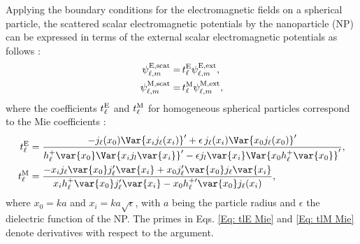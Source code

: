 Applying the boundary conditions for the electromagnetic fields on a spherical particle, the scattered scalar electromagnetic potentials by the nanoparticle (NP) can be expressed in terms of the external scalar electromagnetic potentials as follows \cite{de1999relativistic}:
\begin{align}
\psi_{\ell, m}^{\rm E, scat} =& \,t_{\ell}^{\rm E} \psi_{\ell, m}^{\rm E, \text{ext}}, \label{Eq: psilm E scat}\\
\psi_{\ell, m}^{\rm M, scat} =& \,t_{\ell}^{\rm M} \psi_{\ell, m}^{\rm M, \text{ext}}, \label{Eq: psilm M scat}
\end{align} 
where the coefficients $t_{\ell}^{\rm E}$ and $t_{\ell}^{\rm M}$ for homogeneous spherical particles correspond to the Mie coefficients \cite{Bohren}:
\begin{align}
t_{\ell}^{\rm E} &=\frac{-j_{\ell}(x_0)\Var{x_i j_{\ell}(x_i)}^{\prime}+\epsilon\,j_{\ell}(x_i)\Var{x_0j_{\ell}(x_0)}^{\prime}}{h^{+}_{\ell}\var{x_0}\Var{x_i j_l\var{x_i}}^{\prime}-\epsilon j_l\var{x_i}\Var{x_0 h_{\ell}^{+}\var{x_0}}^{\prime}}, \label{Eq: tlE Mie}\\
t_{\ell}^{\rm M} &= \frac{-x_i j_{\ell}\var{x_0}j_{\ell}^{\prime}\var{x_i}+ x_0 j_{\ell}^{\prime}\var{x_0} j_{\ell}\var{x_i} }{x_i h_{\ell}^{+}\var{x_0} j_{\ell}^{\prime}\var{x_i} - x_0 h_{\ell}^{+ \prime}\var{x_0} j_{\ell}(x_i)}, \label{Eq: tlM Mie}
\end{align}
where $x_0 = k a$ and $x_i = k a \sqrt{\epsilon}$, with $a$ being the particle radius and $\epsilon$ the dielectric function of the NP. The primes in Eqs. \eqref{Eq: tlE Mie} and \eqref{Eq: tlM Mie} denote derivatives with respect to the argument.

